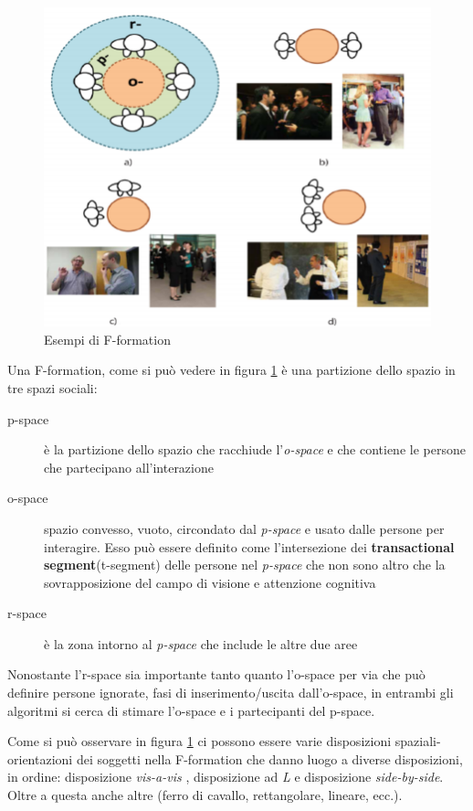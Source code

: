 \documentclass[8pt,twocolumn]{article}
\begin{document}
	\begin{figure}
	    \centering
	    \includegraphics[width=0.8\linewidth]{f_formation}
	    \caption{Esempi di F-formation}
	    \label{fig:f_formation}
	\end{figure}
	
	Una F-formation, come si può vedere in figura \ref{fig:f_formation} è una partizione dello spazio in tre spazi sociali:
	\begin{description}
    	\item [p-space] è la partizione dello spazio che racchiude l'\textit{o-space} e che contiene le persone che partecipano all'interazione
    	\item [o-space] spazio convesso, vuoto, circondato dal \textit{p-space} e usato dalle persone per interagire. Esso può essere definito come l'intersezione dei \textbf{transactional segment}(t-segment) delle persone nel \textit{p-space} che non sono altro che la sovrapposizione del campo di visione e attenzione cognitiva
    	\item [r-space] è la zona intorno al \textit{p-space} che include le altre due aree
	\end{description}
	
	Nonostante l'r-space sia importante tanto quanto l'o-space per via che può definire persone ignorate, fasi di inserimento/uscita dall'o-space, in entrambi gli algoritmi si cerca di stimare l'o-space e i partecipanti del p-space.
	
	Come si può osservare in figura \ref{fig:f_formation} ci possono essere varie disposizioni spaziali-orientazioni dei soggetti nella F-formation che danno luogo a diverse disposizioni, in ordine: disposizione \textit{vis-a-vis} , disposizione ad \textit{L} e disposizione \textit{side-by-side}. Oltre a questa anche altre (ferro di cavallo, rettangolare, lineare, ecc.).
	
\end{document}
